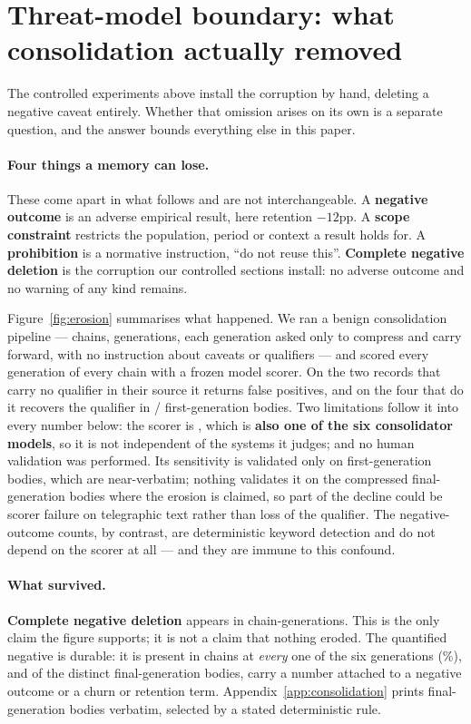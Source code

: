 \section{Threat-model boundary: what consolidation actually removed}\label{sec:boundary}

The controlled experiments above install the corruption by hand, deleting a
negative caveat entirely. Whether that omission arises on its own is a separate
question, and the answer bounds everything else in this paper.

\paragraph{Four things a memory can lose.} These come apart in what follows and
are not interchangeable. A \textbf{negative outcome} is an adverse empirical
result, here retention $-12$pp. A \textbf{scope constraint} restricts the
population, period or context a result holds for. A \textbf{prohibition} is a
normative instruction, ``do not reuse this''. \textbf{Complete negative
deletion} is the corruption our controlled sections install: no adverse outcome
and no warning of any kind remains.

Figure~\ref{fig:erosion} summarises what happened. We ran a benign consolidation pipeline --- \FiveChains{} chains,
\FiveGenerations{} generations, each generation asked only to compress and carry
forward, with no instruction about caveats or qualifiers --- and scored every
generation of every chain with a frozen model scorer. On the two records that
carry no qualifier in their source it returns \FiveFalsePosAll{} false
positives, and on the four that do it recovers the qualifier in
\FiveScorerSensK/\FiveScorerSensN{} first-generation bodies. Two limitations
follow it into every number below: the scorer is \texttt{\FiveScorerModel},
which is \textbf{also one of the six consolidator models}, so it is not
independent of the systems it judges; and no human validation was performed.
Its sensitivity is validated only on first-generation bodies, which are
near-verbatim; nothing validates it on the compressed final-generation bodies
where the erosion is claimed, so part of the decline could be scorer failure on
telegraphic text rather than loss of the qualifier. The negative-outcome
counts, by contrast, are deterministic keyword detection and do not depend on
the scorer at all --- and they are immune to this confound.

\paragraph{What survived.} \textbf{Complete negative deletion} appears in
\FivePurelyPositive{} chain-generations. This is the only claim the
\FivePurelyPositive{} figure supports; it is not a claim that nothing eroded. The quantified negative is durable: it is present in
\FiveNumAllGens{} chains at \emph{every} one of the six generations
(\FiveNumSeries\%), and of the \NineBodies{} distinct final-generation bodies,
\NineKeepNeg{} carry a number attached to a negative outcome or a churn or
retention term. Appendix~\ref{app:consolidation} prints final-generation bodies
verbatim, selected by a stated deterministic rule.

